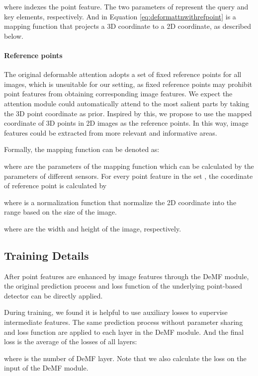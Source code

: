 \documentclass[runningheads]{llncs}
\begin{document}
where  indexes the point feature. The two parameters of  represent the query and key elements, respectively. And  in Equation \ref{eq:deformattnwithrefpoint} is a mapping function that projects a 3D coordinate to a 2D coordinate, as described below.

\paragraph{Reference points}

The original deformable attention adopts a set of fixed reference points for all images, which is unsuitable for our setting, as fixed reference points may prohibit point features from obtaining corresponding image features. We expect the attention module could automatically attend to the most salient parts by taking the 3D point coordinate as prior. Inspired by this, we propose to use the mapped coordinate of 3D points in 2D images as the reference points. In this way, image features could be extracted from more relevant and informative areas.

Formally, the mapping function  can be denoted as:

where  are the parameters of the mapping function  which can be calculated by the parameters of different sensors. For every point feature in the set , the coordinate of reference point  is calculated by

where  is a normalization function that normalize the 2D coordinate into the range  based on the size of the image.

where  are the width and height of the image, respectively.

\subsection{Training Details}

After point features are enhanced by image features through the DeMF module, the original prediction process and loss function  of the underlying point-based detector can be directly applied. 

During training, we found it is helpful to use auxiliary losses to supervise intermediate features. The same prediction process without parameter sharing and loss function are applied to each layer in the DeMF module. And the final loss is the average of the losses of all layers:

where  is the number of DeMF layer. Note that we also calculate the loss on the input of the DeMF module.
\end{document}
